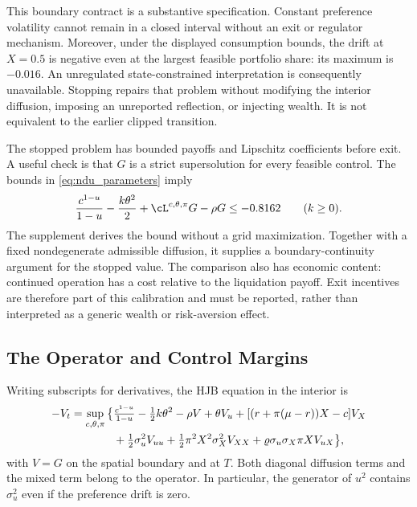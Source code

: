 This boundary contract is a substantive specification. Constant preference volatility cannot remain in a closed interval without an exit or regulator mechanism. Moreover, under the displayed consumption bounds, the drift at $X=0.5$ is negative even at the largest feasible portfolio share: its maximum is $-0.016$. An unregulated state-constrained interpretation is consequently unavailable. Stopping repairs that problem without modifying the interior diffusion, imposing an unreported reflection, or injecting wealth. It is not equivalent to the earlier clipped transition.

The stopped problem has bounded payoffs and Lipschitz coefficients before exit. A useful check is that $G$ is a strict supersolution for every feasible control. The bounds in \eqref{eq:ndu_parameters} imply
\begin{equation}
 \frac{c^{1-u}}{1-u}-\frac{k\theta^2}{2}
 +\cL^{c,\theta,\pi}G-\rho G\leq -0.8162
 \qquad(k\geq0).
 \label{eq:superG}
\end{equation}
The supplement derives the bound without a grid maximization. Together with a fixed nondegenerate admissible diffusion, it supplies a boundary-continuity argument for the stopped value. The comparison also has economic content: continued operation has a cost relative to the liquidation payoff. Exit incentives are therefore part of this calibration and must be reported, rather than interpreted as a generic wealth or risk-aversion effect.

\subsection{The Operator and Control Margins}
Writing subscripts for derivatives, the HJB equation in the interior is
\begin{align}
 -V_t=\sup_{c,\theta,\pi}\big\{
 &\tfrac{c^{1-u}}{1-u}-\tfrac12k\theta^2-\rho V
 +\theta V_u+[(r+\pi(\mu-r))X-c]V_X\notag\\
 &+\tfrac12\sigma_u^2V_{uu}
 +\tfrac12\pi^2X^2\sigma_X^2V_{XX}
 +\varrho\sigma_u\sigma_X\pi X V_{uX}\big\},
 \label{eq:ndu_HJB}
\end{align}
with $V=G$ on the spatial boundary and at $T$. Both diagonal diffusion terms and the mixed term belong to the operator. In particular, the generator of $u^2$ contains $\sigma_u^2$ even if the preference drift is zero.

